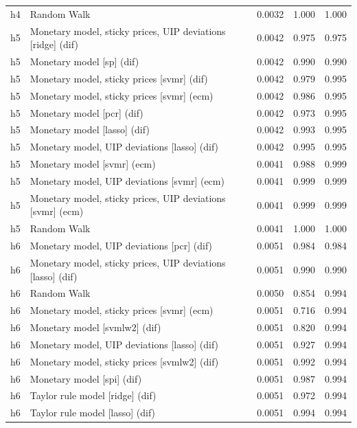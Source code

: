 \begin{ThreePartTable}
\begin{longtable}[t]{cp{5.5cm}ccc}
h4 & \raggedright Random Walk & 0.0032 & 1.000 & 1.000\\
\addlinespace
h5 & \raggedright Monetary model, sticky prices, UIP deviations [ridge] (dif) & 0.0042 & 0.975 & 0.975\\
h5 & \raggedright Monetary model [sp] (dif) & 0.0042 & 0.990 & 0.990\\
h5 & \raggedright Monetary model, sticky prices [svmr] (dif) & 0.0042 & 0.979 & 0.995\\
h5 & \raggedright Monetary model, sticky prices [svmr] (ecm) & 0.0042 & 0.986 & 0.995\\
h5 & \raggedright Monetary model [pcr] (dif) & 0.0042 & 0.973 & 0.995\\
h5 & \raggedright Monetary model [lasso] (dif) & 0.0042 & 0.993 & 0.995\\
h5 & \raggedright Monetary model, UIP deviations [lasso] (dif) & 0.0042 & 0.995 & 0.995\\
h5 & \raggedright Monetary model [svmr] (ecm) & 0.0041 & 0.988 & 0.999\\
h5 & \raggedright Monetary model, UIP deviations [svmr] (ecm) & 0.0041 & 0.999 & 0.999\\
h5 & \raggedright Monetary model, sticky prices, UIP deviations [svmr] (ecm) & 0.0041 & 0.999 & 0.999\\
h5 & \raggedright Random Walk & 0.0041 & 1.000 & 1.000\\
\addlinespace
h6 & \raggedright Monetary model, UIP deviations [pcr] (dif) & 0.0051 & 0.984 & 0.984\\
h6 & \raggedright Monetary model, sticky prices, UIP deviations [lasso] (dif) & 0.0051 & 0.990 & 0.990\\
h6 & \raggedright Random Walk & 0.0050 & 0.854 & 0.994\\
h6 & \raggedright Monetary model, sticky prices [svmr] (ecm) & 0.0051 & 0.716 & 0.994\\
h6 & \raggedright Monetary model [svmlw2] (dif) & 0.0051 & 0.820 & 0.994\\
h6 & \raggedright Monetary model, UIP deviations [lasso] (dif) & 0.0051 & 0.927 & 0.994\\
h6 & \raggedright Monetary model, sticky prices [svmlw2] (dif) & 0.0051 & 0.992 & 0.994\\
h6 & \raggedright Monetary model [spi] (dif) & 0.0051 & 0.987 & 0.994\\
h6 & \raggedright Taylor rule model [ridge] (dif) & 0.0051 & 0.972 & 0.994\\
h6 & \raggedright Taylor rule model [lasso] (dif) & 0.0051 & 0.994 & 0.994\\

\end{longtable}
\end{ThreePartTable}
